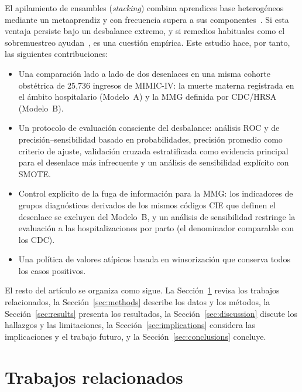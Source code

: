 \documentclass[healthcare,article,submit,pdftex,moreauthors]{Definitions/mdpi_es}
\begin{document}
El apilamiento de ensambles (\emph{stacking}) combina aprendices base heterogéneos
mediante un metaaprendiz y con frecuencia supera a sus componentes~\cite{Wolpert1992Stacking,Hastie2009ESL}.
Si esta ventaja persiste bajo un desbalance extremo, y si remedios habituales como el
sobremuestreo ayudan~\cite{vandenGoorbergh2022Harm}, es una cuestión empírica.
Este estudio hace, por tanto, las siguientes contribuciones:
\begin{itemize}[leftmargin=*,labelsep=5.8mm]
  \item Una comparación lado a lado de dos desenlaces en una misma cohorte obstétrica
        de 25{,}736 ingresos de MIMIC-IV: la muerte materna registrada en el ámbito
        hospitalario (Modelo~A) y la MMG definida por CDC/HRSA (Modelo~B).
  \item Un protocolo de evaluación consciente del desbalance: análisis ROC y de
        precisión--sensibilidad basado en probabilidades, precisión promedio como criterio
        de ajuste, validación cruzada estratificada como evidencia principal para el
        desenlace más infrecuente y un análisis de sensibilidad explícito con SMOTE.
  \item Control explícito de la fuga de información para la MMG: los indicadores de
        grupos diagnósticos derivados de los mismos códigos CIE que definen el desenlace
        se excluyen del Modelo~B, y un análisis de sensibilidad restringe la evaluación a
        las hospitalizaciones por parto (el denominador comparable con los CDC).
  \item Una política de valores atípicos basada en winsorización que conserva todos los
        casos positivos.
\end{itemize}
El resto del artículo se organiza como sigue. La Sección~\ref{sec:related}
revisa los trabajos relacionados, la Sección~\ref{sec:methods} describe los datos y los
métodos, la Sección~\ref{sec:results} presenta los resultados, la Sección~\ref{sec:discussion}
discute los hallazgos y las limitaciones, la Sección~\ref{sec:implications} considera las
implicaciones y el trabajo futuro, y la Sección~\ref{sec:conclusions} concluye.

\section{Trabajos relacionados}\label{sec:related}
\end{document}
